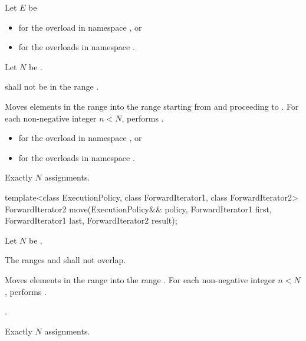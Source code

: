 \begin{itemdescr}
\pnum
Let $E$ be
\begin{itemize}
\item
  for the overload in namespace , or
\item
  for the overloads in namespace .
\end{itemize}
Let $N$ be .

\pnum
\requires
{} shall not be in the range .

\pnum
\effects
Moves elements in the range 
into the range 
starting from  and proceeding to .
For each non-negative integer $n < N$, performs .

\pnum
\returns
\begin{itemize}
\item
  for the overload in namespace , or
\item
  for the overloads in namespace .
\end{itemize}

\pnum
\complexity
Exactly $N$ assignments.
\end{itemdescr}

%
\begin{itemdecl}
template<class ExecutionPolicy, class ForwardIterator1, class ForwardIterator2>
  ForwardIterator2 move(ExecutionPolicy&& policy,
                        ForwardIterator1 first, ForwardIterator1 last,
                        ForwardIterator2 result);
\end{itemdecl}

\begin{itemdescr}
\pnum
Let $N$ be .

\pnum
\requires
The ranges  and 
shall not overlap.

\pnum
\effects
Moves elements in the range 
into the range .
For each non-negative integer $n < N$,
performs .

\pnum
\returns
{}.

\pnum
\complexity
Exactly $N$ assignments.
\end{itemdescr}

